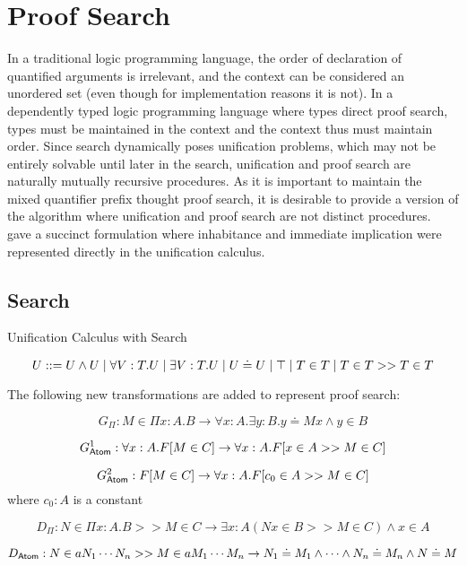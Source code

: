 \section{Proof Search}

In a traditional logic programming language, the order of declaration of quantified arguments is irrelevant, 
and the context can be considered an unordered set (even though for implementation reasons it is not). 
In a dependently typed logic programming language where types direct proof search, types must be maintained in the context
and the context thus must maintain order.   Since search dynamically poses unification problems, which may not be 
entirely solvable until later in the search, unification and proof search are naturally mutually recursive procedures.
As it is important to maintain the mixed quantifier prefix thought proof search, it is desirable to provide a version 
of the algorithm where unification and proof search are not distinct procedures. 
\citep{pfenning1991logic} gave a succinct formulation where inhabitance and immediate implication were represented
directly in the unification calculus.  

\subsection{Search}

\begin{definition}
Unification Calculus with Search

\[
U ::= U \wedge U 
 \; | \; \forall V : T . U
 \; | \; \exists V : T . U 
 \; | \; U \doteq U
 \; | \; \top
  \; | \; T \in T 
  \; | \; T \in T >> T \in T
\]

\end{definition}

The following new transformations are added to represent proof search:

\[
G_\Pi : M \in \Pi x : A . B   \rightarrow \forall x : A . \exists y : B . y \doteq M x \wedge y \in B
\]

\[
G^1_{\mathsf{Atom}} : \forall x : A . F[M\in C]  \rightarrow \forall x : A . F[x \in A >> M \in C]
\]

\[
G^2_{\mathsf{Atom}} : F[M\in C]  \rightarrow \forall x : A . F[c_0 \in A >> M \in C]
\]  where $c_0 : A$ is a constant

\[
D_\Pi : N\in \Pi x : A . B >> M \in C \rightarrow \exists x : A ( N x \in B >> M \in C) \wedge x \in A
\]

\[
D_{\mathsf{Atom}} : N\in a N_1 \cdots N_n >> M \in a M_1 \cdots M_n \rightarrow N_1 \doteq M_1 \wedge \cdots \wedge N_n \doteq M_n \wedge N \doteq M
\]

